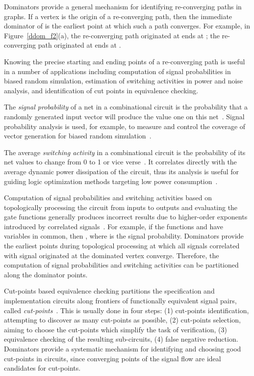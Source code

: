 \documentclass{llncs}
\begin{document}
Dominators provide a general mechanism for identifying re-converging
paths in graphs. If a vertex  is the origin of a
re-converging path, then the immediate dominator of  is the
earliest point at which such a path converges. 
For example, in
Figure~\ref{ddom_f2}(a), the re-converging path originated at  ends at ;
the re-converging path originated at  ends at .

Knowing the precise starting and ending points of a re-converging path
is useful in a number of applications including computation of signal
probabilities in biased random simulation, estimation of switching activities in power and
noise analysis, and identification of cut points in
equivalence checking.

The {\em signal probability} of a net in a combinational circuit is
the probability that a randomly generated input vector will produce
the value one on this net~\cite{PaM75}. Signal probability
analysis is used, for example, to measure and control the coverage of vector
generation for biased random simulation~\cite{KuLWCH07}.

The average {\em switching activity} in a
combinational circuit is the probability of its net values to change
from 0 to 1 or vice verse~\cite{GhDK92}.  It correlates directly with the average
dynamic power dissipation of the circuit, thus its analysis is
useful for guiding logic optimization methods targeting low power consumption~\cite{CoMD97}.


Computation of signal probabilities and switching activities based on
topologically processing the circuit from inputs to outputs and
evaluating the gate functions generally produces incorrect results due
to higher-order exponents introduced by correlated signals~\cite{PaM75}. For
example, if the functions  and  have variables in common, then
, where  is the signal
probability.  Dominators provide the earliest points during
topological processing at which all signals correlated with signal originated at the dominated vertex
converge. Therefore, the computation of
signal probabilities and switching activities can be 
partitioned along the dominator points.


Cut-points
based equivalence checking partitions the specification and implementation 
circuits along frontiers of functionally equivalent signal pairs, called 
{\em cut-points}~\cite{KhMKH01}.  This is usually done in four steps: (1) cut-points
identification, attempting to discover as many cut-points as possible,
(2) cut-points selection, aiming to choose the cut-points which
simplify the task of verification, (3) equivalence checking of the
resulting sub-circuits, (4) false negative reduction.
Dominators provide a systematic mechanism for identifying and choosing good cut-points
in circuits, since converging points of the signal flow are ideal candidates for cut-points.
\end{document}

